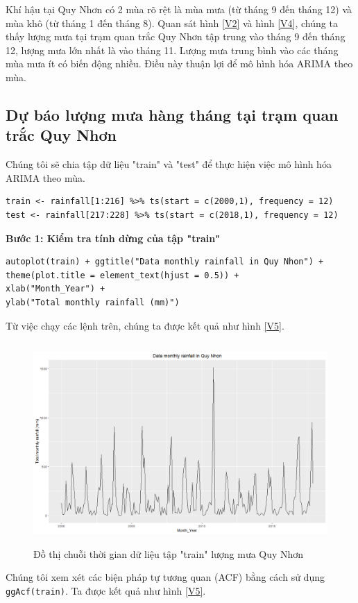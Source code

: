 \documentclass[12pt, a4paper,oneside]{book}
\theoremstyle{definition}
\begin{document}
Khí hậu tại Quy Nhơn có 2 mùa rõ rệt là mùa mưa (từ tháng 9 đến tháng 12) và mùa khô (từ tháng 1 đến tháng 8). Quan sát hình \ref{V2} và hình \ref{V4}, chúng ta thấy lượng mưa tại trạm quan trắc Quy Nhơn tập trung vào tháng 9 đến tháng 12, lượng mưa lớn nhất là vào tháng 11. Lượng mưa trung bình vào các tháng mùa mưa ít có biến động nhiều. Điều này thuận lợi để mô hình hóa ARIMA theo mùa.

\subsection{\label{lmqn}Dự báo lượng mưa hàng tháng tại trạm quan trắc Quy Nhơn}
Chúng tôi sẽ chia tập dữ  liệu "train" và "test" để thực hiện việc mô hình hóa ARIMA theo mùa.\\
\begin{lstlisting}
train <- rainfall[1:216] %>% ts(start = c(2000,1), frequency = 12)
test <- rainfall[217:228] %>% ts(start = c(2018,1), frequency = 12)
\end{lstlisting}
\textbf{Bước 1: Kiểm tra tính dừng của tập "train"}\\
\begin{lstlisting}
autoplot(train) + ggtitle("Data monthly rainfall in Quy Nhon") + 
theme(plot.title = element_text(hjust = 0.5)) + 
xlab("Month_Year") +
ylab("Total monthly rainfall (mm)")
\end{lstlisting}
Từ việc chạy các lệnh trên, chúng ta được kết quả như hình \ref{V5}.
\begin{figure}[!htb]
	\centering
	\includegraphics[width=1\linewidth,height=7.7cm]{anh/V5}
	\vskip-4mm 
	\caption{Đồ thị chuỗi thời gian dữ liệu tập "train" lượng mưa Quy Nhơn}  
	\label{V1}
\end{figure}
Chúng tôi xem xét các biện pháp tự tương quan (ACF) bằng cách sử dụng \lstinline{ggAcf(train)}. Ta được kết quả như hình \ref{V5}.
\end{document}
